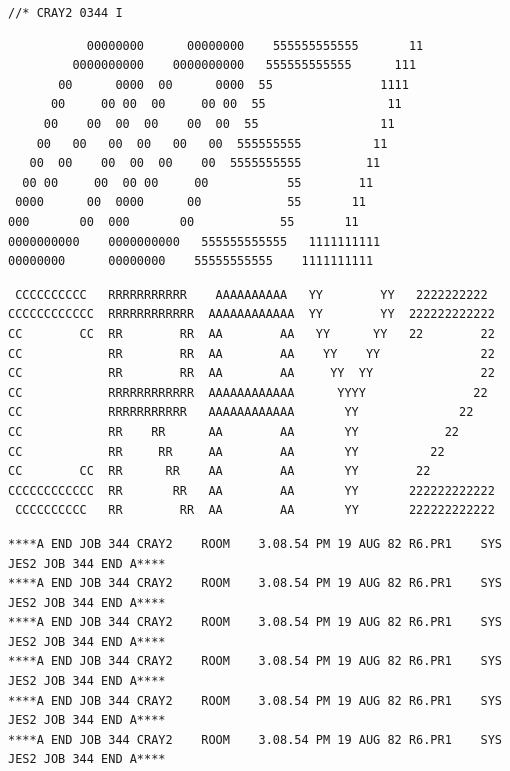 \texttt{//* CRAY2 0344 I}
\begin{verbatim}
           00000000      00000000    555555555555       11
         0000000000    0000000000   555555555555      111
       00      0000  00      0000  55               1111
      00     00 00  00     00 00  55                 11
     00    00  00  00    00  00  55                 11
    00   00   00  00   00   00  555555555          11
   00  00    00  00  00    00  5555555555         11
  00 00     00  00 00     00           55        11
 0000      00  0000      00            55       11
000       00  000       00            55       11
0000000000    0000000000   555555555555   1111111111
00000000      00000000    55555555555    1111111111
\end{verbatim}
\begin{verbatim}
 CCCCCCCCCC   RRRRRRRRRRR    AAAAAAAAAA   YY        YY   2222222222
CCCCCCCCCCCC  RRRRRRRRRRRR  AAAAAAAAAAAA  YY        YY  222222222222
CC        CC  RR        RR  AA        AA   YY      YY   22        22
CC            RR        RR  AA        AA    YY    YY              22
CC            RR        RR  AA        AA     YY  YY               22
CC            RRRRRRRRRRRR  AAAAAAAAAAAA      YYYY               22
CC            RRRRRRRRRRR   AAAAAAAAAAAA       YY              22
CC            RR    RR      AA        AA       YY            22
CC            RR     RR     AA        AA       YY          22
CC        CC  RR      RR    AA        AA       YY        22
CCCCCCCCCCCC  RR       RR   AA        AA       YY       222222222222
 CCCCCCCCCC   RR        RR  AA        AA       YY       222222222222
\end{verbatim}
\begin{verbatim}
****A END JOB 344 CRAY2    ROOM    3.08.54 PM 19 AUG 82 R6.PR1    SYS JES2 JOB 344 END A****
****A END JOB 344 CRAY2    ROOM    3.08.54 PM 19 AUG 82 R6.PR1    SYS JES2 JOB 344 END A****
****A END JOB 344 CRAY2    ROOM    3.08.54 PM 19 AUG 82 R6.PR1    SYS JES2 JOB 344 END A****
****A END JOB 344 CRAY2    ROOM    3.08.54 PM 19 AUG 82 R6.PR1    SYS JES2 JOB 344 END A****
****A END JOB 344 CRAY2    ROOM    3.08.54 PM 19 AUG 82 R6.PR1    SYS JES2 JOB 344 END A****
****A END JOB 344 CRAY2    ROOM    3.08.54 PM 19 AUG 82 R6.PR1    SYS JES2 JOB 344 END A****
\end{verbatim}
